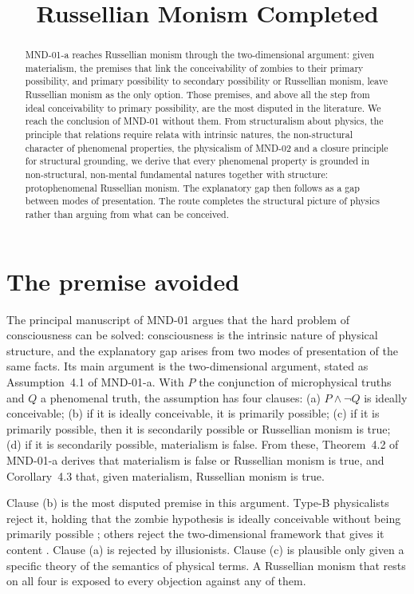 \documentclass{situationist-preprint}
\title{Russellian Monism Completed}
\begin{document}
\maketitle

\begin{abstract}
MND-01-a reaches Russellian monism through the two-dimensional argument: given materialism, the premises that link the conceivability of zombies to their primary possibility, and primary possibility to secondary possibility or Russellian monism, leave Russellian monism as the only option. Those premises, and above all the step from ideal conceivability to primary possibility, are the most disputed in the literature. We reach the conclusion of MND-01 without them. From structuralism about physics, the principle that relations require relata with intrinsic natures, the non-structural character of phenomenal properties, the physicalism of MND-02 and a closure principle for structural grounding, we derive that every phenomenal property is grounded in non-structural, non-mental fundamental natures together with structure: protophenomenal Russellian monism. The explanatory gap then follows as a gap between modes of presentation. The route completes the structural picture of physics rather than arguing from what can be conceived.
\end{abstract}

\section{The premise avoided}\label{s:avoid}

The principal manuscript of MND-01 argues that the hard problem of consciousness can be solved: consciousness is the intrinsic nature of physical structure, and the explanatory gap arises from two modes of presentation of the same facts. Its main argument is the two-dimensional argument, stated as Assumption~4.1 of MND-01-a. With $P$ the conjunction of microphysical truths and $Q$ a phenomenal truth, the assumption has four clauses: (a) $P \wedge \neg Q$ is ideally conceivable; (b) if it is ideally conceivable, it is primarily possible; (c) if it is primarily possible, then it is secondarily possible or Russellian monism is true; (d) if it is secondarily possible, materialism is false. From these, Theorem~4.2 of MND-01-a derives that materialism is false or Russellian monism is true, and Corollary~4.3 that, given materialism, Russellian monism is true.

Clause (b) is the most disputed premise in this argument. Type-B physicalists reject it, holding that the zombie hypothesis is ideally conceivable without being primarily possible \citep{Loar1990,Papineau2002}; others reject the two-dimensional framework that gives it content \citep{BlockStalnaker1999}. Clause (a) is rejected by illusionists. Clause (c) is plausible only given a specific theory of the semantics of physical terms. A Russellian monism that rests on all four is exposed to every objection against any of them.
\end{document}
